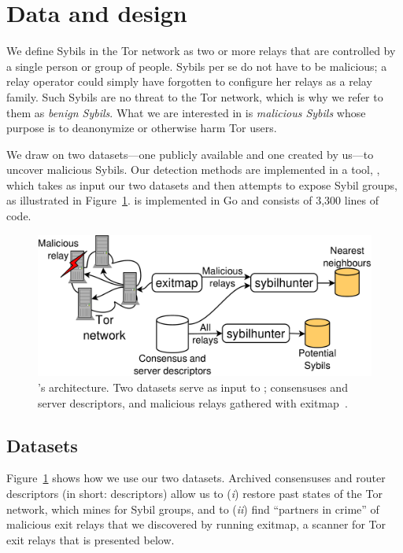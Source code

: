 \section{Data and design}
\label{sec:design}
We define Sybils in the Tor network as two or more relays that are controlled by
a single person or group of people.  Sybils per se do not have to be malicious;
a relay operator could simply have forgotten to configure her relays as a relay
family.  Such Sybils are no threat to the Tor network, which is why we refer to
them as \emph{benign Sybils}.  What we are interested in is \emph{malicious
Sybils} whose purpose is to deanonymize or otherwise harm Tor users.

We draw on two datasets---one publicly available and one created by us---to
uncover malicious Sybils.  Our detection methods are implemented in a tool,
\sys, which takes as input our two datasets and then attempts to expose Sybil
groups, as illustrated in Figure~\ref{fig:system}.  \Sys is implemented in Go
and consists of 3,300 lines of code.

\begin{figure}[t]
	\centering
	\includegraphics[width=\linewidth]{diagrams/system_architecture.pdf}
	\caption{\Sys's architecture.  Two datasets serve as input to
		\sys; consensuses and server descriptors, and malicious
		relays gathered with exitmap~\cite{Winter2014a}.}
	\label{fig:system}
\end{figure}

\subsection{Datasets}
\label{sec:datasets}
Figure~\ref{fig:system} shows how we use our two datasets.  Archived consensuses
and router descriptors (in short: descriptors) allow us to (\emph{i}) restore
past states of the Tor network, which \sys mines for Sybil groups, and to
(\emph{ii}) find ``partners in crime'' of malicious exit relays that we
discovered by running exitmap, a scanner for Tor exit relays that is presented
below.

